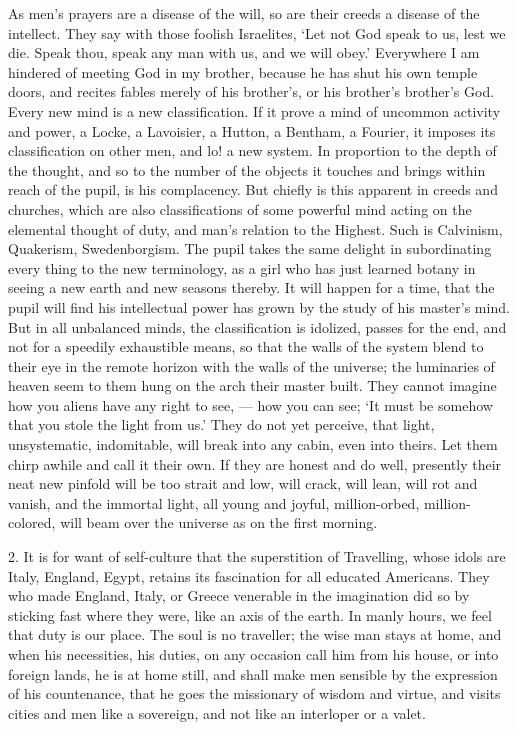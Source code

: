 \documentclass[12pt]{article}
\begin{document}
As men's prayers are a disease of the will, so are their creeds a disease of
the intellect. They say with those foolish Israelites, `Let not God speak to
us, lest we die. Speak thou, speak any man with us, and we will obey.'
Everywhere I am hindered of meeting God in my brother, because he has shut
his own temple doors, and recites fables merely of his brother's, or his
brother's brother's God. Every new mind is a new classification. If it prove
a mind of uncommon activity and power, a Locke, a Lavoisier, a Hutton, a
Bentham, a Fourier, it imposes its classification on other men, and lo! a
new system. In proportion to the depth of the thought, and so to the number
of the objects it touches and brings within reach of the pupil, is his
complacency. But chiefly is this apparent in creeds and churches, which are
also classifications of some powerful mind acting on the elemental thought
of duty, and man's relation to the Highest. Such is Calvinism, Quakerism,
Swedenborgism. The pupil takes the same delight in subordinating every thing
to the new terminology, as a girl who has just learned botany in seeing a
new earth and new seasons thereby. It will happen for a time, that the pupil
will find his intellectual power has grown by the study of his master's
mind. But in all unbalanced minds, the classification is idolized, passes
for the end, and not for a speedily exhaustible means, so that the walls of
the system blend to their eye in the remote horizon with the walls of the
universe; the luminaries of heaven seem to them hung on the arch their
master built. They cannot imagine how you aliens have any right to see, ---
how you can see; `It must be somehow that you stole the light from us.' They
do not yet perceive, that light, unsystematic, indomitable, will break into
any cabin, even into theirs. Let them chirp awhile and call it their own. If
they are honest and do well, presently their neat new pinfold will be too
strait and low, will crack, will lean, will rot and vanish, and the immortal
light, all young and joyful, million-orbed, million-colored, will beam over
the universe as on the first morning.

2. It is for want of self-culture that the superstition of Travelling, whose
idols are Italy, England, Egypt, retains its fascination for all educated
Americans. They who made England, Italy, or Greece venerable in the
imagination did so by sticking fast where they were, like an axis of the
earth. In manly hours, we feel that duty is our place. The soul is no
traveller; the wise man stays at home, and when his necessities, his duties,
on any occasion call him from his house, or into foreign lands, he is at
home still, and shall make men sensible by the expression of his
countenance, that he goes the missionary of wisdom and virtue, and visits
cities and men like a sovereign, and not like an interloper or a valet.
\end{document}
